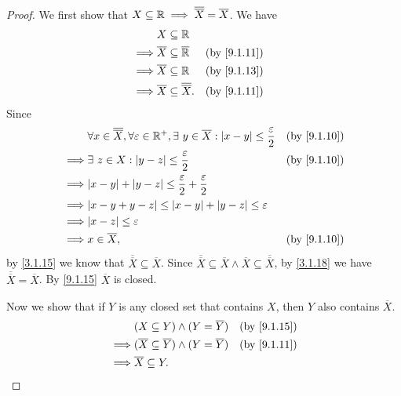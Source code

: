 \begin{proof}
  We first show that \(X \subseteq \mathbb{R} \implies \overline{\overline{X}} = \overline{X}\).
  We have
  \begin{align*}
             & X \subseteq \R                                                                 \\
    \implies & \overline{X} \subseteq \overline{\R}            &  & \text{(by \cref{9.1.11})} \\
    \implies & \overline{X} \subseteq \R                       &  & \text{(by \cref{9.1.13})} \\
    \implies & \overline{X} \subseteq \overline{\overline{X}}. &  & \text{(by \cref{9.1.11})}
  \end{align*}
  Since
  \begin{align*}
             & \forall x \in \overline{\overline{X}}, \forall \varepsilon \in \R^+, \exists\ y \in \overline{X} : \abs{x - y} \leq \dfrac{\varepsilon}{2} &  & \text{(by \cref{9.1.10})} \\
    \implies & \exists\ z \in X : \abs{y - z} \leq \dfrac{\varepsilon}{2}                                                                                 &  & \text{(by \cref{9.1.10})} \\
    \implies & \abs{x - y} + \abs{y - z} \leq \dfrac{\varepsilon}{2} + \dfrac{\varepsilon}{2}                                                                                            \\
    \implies & \abs{x - y + y - z} \leq \abs{x - y} + \abs{y - z} \leq \varepsilon                                                                                                       \\
    \implies & \abs{x - z} \leq \varepsilon                                                                                                                                              \\
    \implies & x \in \overline{X},                                                                                                                        &  & \text{(by \cref{9.1.10})}
  \end{align*}
  by \cref{3.1.15} we know that \(\overline{\overline{X}} \subseteq \overline{X}\).
  Since \(\overline{\overline{X}} \subseteq \overline{X} \land \overline{X} \subseteq \overline{\overline{X}}\), by \cref{3.1.18} we have \(\overline{\overline{X}} = \overline{X}\).
  By \cref{9.1.15} \(\overline{X}\) is closed.

  Now we show that if \(Y\) is any closed set that contains \(X\), then \(Y\) also contains \(\overline{X}\).
  \begin{align*}
             & (X \subseteq Y) \land (Y = \overline{Y})                       &  & \text{(by \cref{9.1.15})} \\
    \implies & (\overline{X} \subseteq \overline{Y}) \land (Y = \overline{Y}) &  & \text{(by \cref{9.1.11})} \\
    \implies & \overline{X} \subseteq Y.
  \end{align*}
\end{proof}


